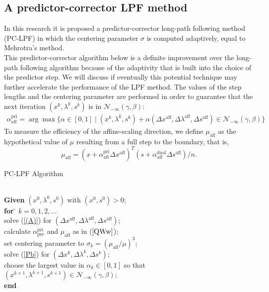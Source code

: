 \documentclass[a4paper,10 pt,titlepage,twoside]{book}
\theoremstyle{plain}
\theoremstyle{definition}
\theoremstyle{remark}
\begin{document}
\subsection{A predictor-corrector LPF method}
In this research it is proposed a predictor-corrector long-path following method (PC-LPF) in which the centering parameter $\sigma$ is computed adaptively, equal to Mehrotra's method.\\
This predictor-corrector algorithm below is a definite improvement over the long-path following algorithm because of the adaptivity that is built into the choice of the predictor step. We will discuss if eventually this potential
technique may further accelerate the performance of the LPF method.
The values of the step lengths and the centering parameter are performed in order to guarantee that the next iteration $(x^{k}, \lambda^{k}, s^{k})$ is in $\mathcal{N}_{-\infty}(\gamma,\beta)$:
\begin{align}\label{QWw}
\alpha_{\text{aff}}^{\text{pri}}=\arg\max\{\alpha\in[0,1]\;|\;(x^{k}, \lambda^{k}, s^{k})+ \alpha(\Delta x^{\text{aff}}, \Delta\lambda^{\text{aff}}, \Delta s^{\text{aff}})\in\mathcal{N}_{-\infty}(\gamma,\beta)\}
\end{align}
To measure the efficiency of the affine-scaling direction, we define $\mu_{\text{aff}}$ as the hypothetical value of $\mu$ resulting from a full step to the boundary, that is,
\begin{equation*}
\mu_{\text{aff}}= (x+\alpha_{\text{aff}}^{\text{pri}}\Delta x^{\text{aff}})^{T}(s+\alpha_{\text{aff}}^{\text{dual}}\Delta s^{\text{aff}})/n.
\end{equation*}
\begin{algorithm}\caption{\label{alg:pc}PC-LPF Algorithm}
\begin{tabbing}
	\\
	\textbf{Given} $(x^{0}, \lambda^{0}, s^{0})$ with $(x^{0}, s^{0})> 0$; \\
	\textbf{for} \= $k = 0, 1, 2,...$ \\
	\> solve (\ref{(A)}) for $(\Delta x^{\text{aff}},\Delta \lambda^{\text{aff}},\Delta s^{\text{aff}})$;\\
	\> calculate $\alpha_{\text{pre}}^{\text{pri}}$ and $\mu_{\text{aff}}$ as in ($\ref{QWw}$);\\
	\> set centering parameter to $\sigma_{k} = (\mu_{\text{aff}}/\mu)^{3}$; \\
	\> solve (\ref{Pb}) for $(\Delta x^{k},\Delta \lambda^{k},\Delta s^{k})$;\\
	\> choose the largest value in $\alpha_{k}\in[0,1]$ so that $(x^{k+1}, \lambda^{k+1}, s^{k+1})\in\mathcal{N}_{-\infty}(\gamma,\beta)$;\\
	\textbf{end}
\end{tabbing}
\end{algorithm}
\newpage
\end{document}
